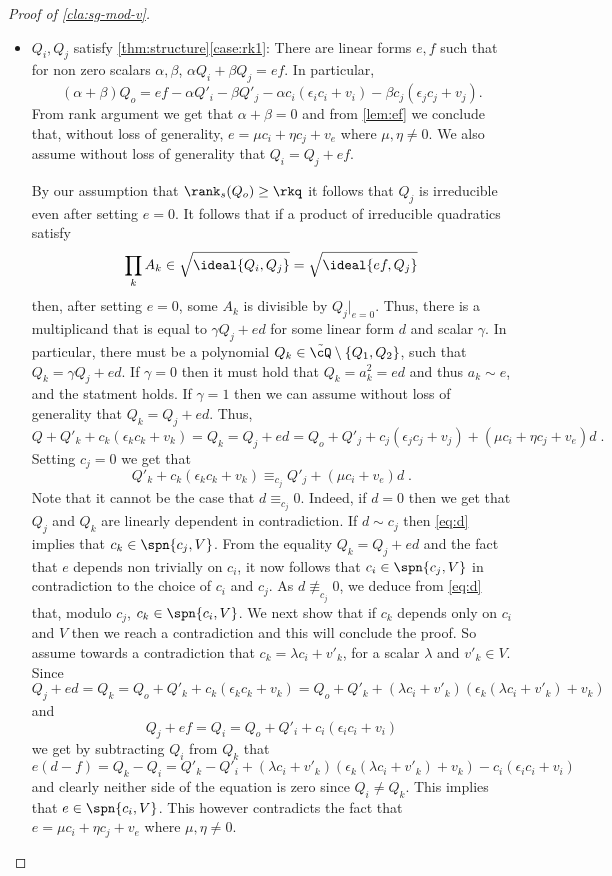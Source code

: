 \begin{proof}[Proof of \autoref{cla:sg-mod-v}]
\begin{itemize}
\item $Q_i,Q_j$ satisfy \autoref{thm:structure}\ref{case:rk1}: 
There are linear forms $e,f$ such that for non zero scalars $\alpha,\beta$, $\alpha Q_i + \beta Q_j = ef$. In particular, 
\[(\alpha + \beta ) Q_o = ef - \alpha Q'_i - \beta Q'_j - \alpha c_i(\epsilon_i c_i + v_i ) - \beta c_j(\epsilon_j c_j + v_j).\]
From rank argument we get that $\alpha+ \beta = 0$ and from \autoref{lem:ef} we conclude that, without loss of generality, $e = \mu c_i + \eta c_j +v_e$ where $\mu, \eta \neq 0$. We also assume without loss of generality that $Q_i=Q_j+ef$.


By our assumption that $\rank_s(Q_o)\geq \rkq$ it follows that $Q_j$ is irreducible even after setting $e=0$. It follows that if a product of irreducible quadratics satisfy $$\prod_k A_k \in \sqrt{\ideal{Q_i,Q_j}} = \sqrt{\ideal{ef,Q_j}}$$ then, after setting $e=0$, some $A_k$ is divisible by ${Q_j}|_{e=0}$. Thus, there is a multiplicand that is equal to $ \gamma Q_j + ed$ for some linear form $d$ and scalar $\gamma$. In particular, there must be a polynomial $Q_k \in \tilde\cQ\setminus\{Q_1,Q_2\}$, such that  $Q_k = \gamma Q_j + ed$. If $\gamma = 0$ then it must hold that $Q_k = a_k^2 = ed$ and thus $a_k \sim e$, and the statment holds. If $\gamma = 1$ then we can assume without loss of generality that $Q_k =  Q_j + ed$. Thus,
$$ Q + Q'_k + c_k(\epsilon_k c_k + v_k) = Q_k =  Q_j + ed = Q_o+ Q'_j +  c_j(\epsilon_j c_j + v_j) + (\mu c_i + \eta c_j + v_e)d \;.$$ 
Setting $c_j=0$ we get that 
\begin{equation}\label{eq:d}
Q'_k + c_k(\epsilon_k c_k +v_k) \equiv_{c_j} Q'_j + (\mu c_i + v_e) d \;.
\end{equation}
Note that it cannot be the case that $d\equiv_{c_j}0$. Indeed, if $d=0$ then we get that $Q_j$ and $Q_k$ are linearly dependent in contradiction. If $d \sim c_j$ then  \eqref{eq:d} implies that $c_k\in\spn{c_j,V}$. From the equality  $Q_k = Q_j + ed$ and the fact that $e$ depends non trivially on $c_i$, it now follows that $c_i \in \spn{c_j,V}$ in contradiction to the choice of $c_i$ and $c_j$. As $d\not\equiv_{c_j}0$, we deduce from \eqref{eq:d} that, modulo $c_j$, $c_k \in \spn{c_i, V}$. We next show that if $c_k$ depends only on $c_i$ and $V$ then we reach a contradiction and this will conclude the proof. So assume towards a contradiction that $c_k = \lambda c_i + v'_k$, for a scalar $\lambda$ and $v'_k\in V$.  Since $$Q_j + ed=Q_k = Q_o+ Q'_k + c_k(\epsilon_k c_k + v_k ) = Q_o+Q'_k+ ( \lambda c_i + v'_k)\left(\epsilon_k  ( \lambda c_i + v'_k) + v_k\right) $$ and $$Q_j + ef = Q_i = Q_o +Q'_i + c_i(\epsilon_i c_i + v_i) $$ we get by subtracting $Q_i$ from $Q_k$ that 
\[
  e(d-f)   = Q_k-Q_i = Q'_k - Q'_i + ( \lambda c_i + v'_k)\left(\epsilon_k  ( \lambda c_i + v'_k) + v_k\right) -c_i(\epsilon_i c_i + v_i) 
\]
and clearly neither side of the equation is zero since $Q_i\neq Q_k$. 
This implies that $e \in \spn{c_i,V}$. This however contradicts the fact that  $e = \mu c_i + \eta c_j +v_e$ where $\mu, \eta \neq 0$. 
\end{itemize}


\end{proof}
